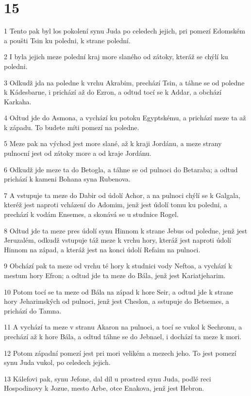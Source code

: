 \chapter{15}

\par 1 Tento pak byl los pokolení synu Juda po celedech jejich, pri pomezí Edomském a poušti Tsin ku poledni, k strane polední.
\par 2 I byla jejich meze polední kraj more slaného od zátoky, kteráž se chýlí ku poledni.
\par 3 Odkudž jda na poledne k vrchu Akrabim, prechází Tsin, a táhne se od poledne k Kádesbarne, i prichází až do Ezron, a odtud tocí se k Addar, a obchází Karkaha.
\par 4 Odtud jde do Asmona, a vychází ku potoku Egyptskému, a prichází meze ta až k západu. To budete míti pomezí na poledne.
\par 5 Meze pak na východ jest more slané, až k kraji Jordánu, a meze strany pulnocní jest od zátoky more a od kraje Jordánu.
\par 6 Odkudž jde meze ta do Betogla, a táhne se od pulnoci do Betaraba; a odtud prichází k kameni Bohana syna Rubenova.
\par 7 A vstupuje ta meze do Dabir od údolí Achor, a na pulnoci chýlí se k Galgala, kteréž jest naproti vcházení do Adomim, jenž jest údolí tomu ku poledni, a prechází k vodám Ensemes, a skonává se u studnice Rogel.
\par 8 Odtud jde ta meze pres údolí synu Hinnom k strane Jebus od poledne, jenž jest Jeruzalém, odkudž vstupuje táž meze k vrchu hory, kteráž jest naproti údolí Hinnom na západ, a kteráž jest na konci údolí Refaim na pulnoci.
\par 9 Obchází pak ta meze od vrchu té hory k studnici vody Neftoa, a vychází k mestum hory Efron; a odtud jde ta meze do Bála, jenž jest Kariatjeharim.
\par 10 Potom tocí se ta meze od Bála na západ k hore Seir, a odtud jde k strane hory Jeharimských od pulnoci, jenž jest Cheslon, a sstupuje do Betsemes, a prichází do Tamna.
\par 11 A vychází ta meze v stranu Akaron na pulnoci, a tocí se vukol k Sechronu, a prechází až k hore Bála, a odtud táhne se do Jebnael, i dochází ta meze k mori.
\par 12 Potom západní pomezí jest pri mori velikém a mezech jeho. To jest pomezí synu Juda vukol, po celedech jejich.
\par 13 Kálefovi pak, synu Jefone, dal díl u prostred synu Juda, podlé reci Hospodinovy k Jozue, mesto Arbe, otce Enakova, jenž jest Hebron.
